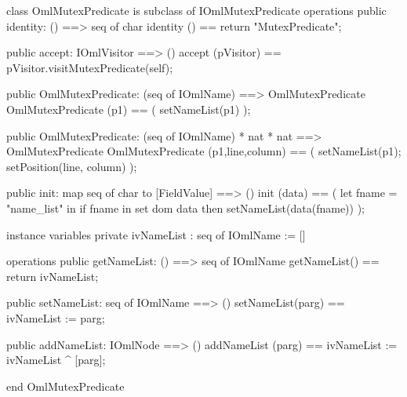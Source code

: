 \begin{vdm_al}
class OmlMutexPredicate is subclass of IOmlMutexPredicate
operations
  public identity: () ==> seq of char
  identity () == return "MutexPredicate";

  public accept: IOmlVisitor ==> ()
  accept (pVisitor) == pVisitor.visitMutexPredicate(self);

  public OmlMutexPredicate:
    (seq of IOmlName) ==> OmlMutexPredicate
  OmlMutexPredicate (p1) == 
    ( setNameList(p1) );

  public OmlMutexPredicate:
    (seq of IOmlName) *
    nat *
    nat ==> OmlMutexPredicate
  OmlMutexPredicate (p1,line,column) == 
    ( setNameList(p1);
      setPosition(line, column) );

  public init: map seq of char to [FieldValue] ==> ()
  init (data) ==
    ( let fname = "name_list" in
        if fname in set dom data
        then setNameList(data(fname)) );

instance variables
  private ivNameList : seq of IOmlName := []

operations
  public getNameList: () ==> seq of IOmlName
  getNameList() == return ivNameList;

  public setNameList: seq of IOmlName ==> ()
  setNameList(parg) == ivNameList := parg;

  public addNameList: IOmlNode ==> ()
  addNameList (parg) == ivNameList := ivNameList ^ [parg];

end OmlMutexPredicate
\end{vdm_al}


